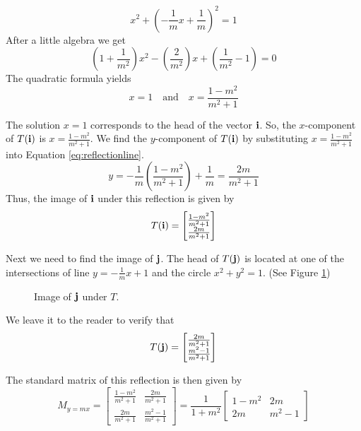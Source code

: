 \documentclass{ximera}
\renewcommand{\vec}[1]{{\bf #1}}
\begin{document}
   $$x^2+\left(-\frac{1}{m}x+\frac{1}{m}\right)^2=1$$
   After a little algebra we get
   $$\left(1+\frac{1}{m^2}\right)x^2-\left(\frac{2}{m^2}\right)x+\left(\frac{1}{m^2}-1\right)=0$$
   The quadratic formula yields 
   $$x=1\quad\text{and}\quad x=\frac{1-m^2}{m^2+1}$$
   
   The solution $x=1$ corresponds to the head of the vector $\vec{i}$.  So, the $x$-component of $T(\vec{i})$ is $x=\frac{1-m^2}{m^2+1}$.  We find the $y$-component of $T(\vec{i})$ by
   substituting $x=\frac{1-m^2}{m^2+1}$ into Equation \ref{eq:reflectionline}.
   $$ y=-\frac{1}{m}\left(\frac{1-m^2}{m^2+1}\right)+\frac{1}{m}=\frac{2m}{m^2+1}$$
   Thus, the image of $\vec{i}$ under this reflection is given by
   $$T(\vec{i})=\begin{bmatrix}\frac{1-m^2}{m^2+1}\\\frac{2m}{m^2+1}\end{bmatrix}$$
   
Next we need to find the image of $\vec{j}$. The head of $T(\vec{j})$ is located at one of the intersections of line $y=-\frac{1}{m}x+1$ and the circle $x^2+y^2=1$.  (See Figure \ref{fig:t2}) 
   
    \begin{figure}[h]
    \centering
{}
\caption{Image of $\vec{j}$ under $T$.}
        \label{fig:t2}
    \end{figure}

We leave it to the reader to verify that
\begin{equation}\label{eq:imageofj} T(\vec{j})=\begin{bmatrix}\frac{2m}{m^2+1}\\\frac{m^2-1}{m^2+1}\end{bmatrix}\end{equation}

The standard matrix of this reflection is then given by 
$$M_{y=mx}=\begin{bmatrix}\frac{1-m^2}{m^2+1} & \frac{2m}{m^2+1}\\\frac{2m}{m^2+1} & \frac{m^2-1}{m^2+1}\end{bmatrix}=\frac{1}{1+m^2}\begin{bmatrix}
1-m^2 & 2m \\
2m & m^2-1
\end{bmatrix}$$
\end{document}

